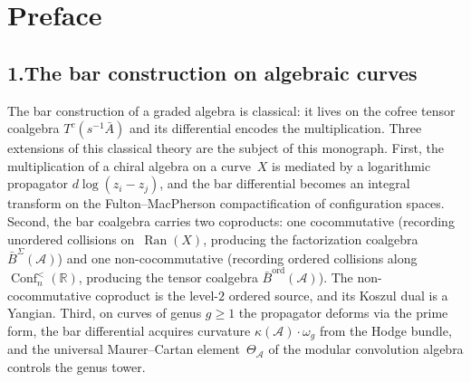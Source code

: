 \documentclass[11pt]{report}
\theoremstyle{definition}
\theoremstyle{remark}
\providecommand{\cA}{\mathcal{A}}
\providecommand{\barB}{\bar{B}}
\numberwithin{equation}{section}
\begin{document}

\chapter*{Preface}
\label{ch:preface}

\vspace{1em}

\section*{1.\quad The bar construction on algebraic curves}

\medskip

\noindent
The bar construction of a graded algebra is classical: it lives on the
cofree tensor coalgebra $T^c(s^{-1}\bar A)$ and its differential
encodes the multiplication. Three extensions of this classical theory
are the subject of this monograph. First, the multiplication of a
chiral algebra on a curve~$X$ is mediated by a logarithmic propagator
$d\log(z_i - z_j)$, and the bar differential becomes an integral
transform on the Fulton--MacPherson compactification of configuration
spaces. Second, the bar coalgebra carries two coproducts: one
cocommutative (recording unordered collisions on~$\operatorname{Ran}(X)$,
producing the factorization coalgebra $\barB^{\Sigma}(\cA)$) and one
non-cocommutative (recording ordered collisions along
$\operatorname{Conf}_n^{<}(\mathbb R)$, producing the tensor coalgebra
$\barB^{\mathrm{ord}}(\cA)$). The non-cocommutative coproduct is the
level-$2$ ordered source, and its Koszul dual is a Yangian. Third, on curves
of genus $g \ge 1$ the propagator deforms via the prime form, the bar
differential acquires curvature $\kappa(\cA)\cdot\omega_g$ from the
Hodge bundle, and the universal Maurer--Cartan element~$\Theta_{\cA}$
of the modular convolution algebra controls the genus tower.
\end{document}
